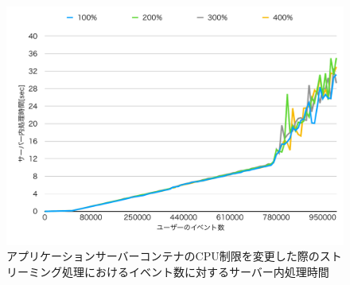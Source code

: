 \documentclass[../../../../../main]{subfiles}
\begin{document}
    \begin{figure}[H]
        \centering
        \includegraphics[width=12cm]{graph}
        \caption{アプリケーションサーバーコンテナのCPU制限を変更した際のストリーミング処理におけるイベント数に対するサーバー内処理時間}
        \label{fig:stream-change-cpu-limit-server-time-app_1024-db_1_1024}
    \end{figure}
\end{document}
